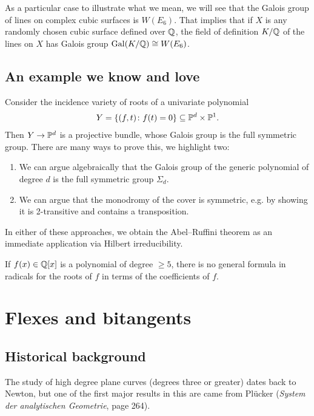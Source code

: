 \documentclass[11pt]{amsart}
\begin{document}
As a particular case to illustrate what we mean, we will see that the Galois group of lines on complex cubic surfaces is $W(E_6)$. That implies that if $X$ is any randomly chosen cubic surface defined over $\Q$, the field of definition $K/\Q$ of the lines on $X$ has Galois group $\Gal(K/\Q) \cong W(E_6)$.

\subsection{An example we know and love}

Consider the incidence variety of roots of a univariate polynomial
\begin{align*}
    Y = \left\{ (f,t) \colon f(t) = 0 \right\} \subseteq \P^d \times \P^1.
\end{align*}
Then $Y \to \P^d$ is a projective bundle, whose Galois group is the full symmetric group. There are many ways to prove this, we highlight two:
\begin{enumerate}
    \item We can argue algebraically that the Galois group of the generic polynomial of degree $d$ is the full symmetric group $\Sigma_d$.
    \item We can argue that the monodromy of the cover is symmetric, e.g. by showing it is 2-transitive and contains a transposition.
\end{enumerate}

In either of these approaches, we obtain the Abel--Ruffini theorem as an immediate application via Hilbert irreducibility.

\begin{theorem} If $f(x) \in \Q[x]$ is a polynomial of degree $\ge 5$, there is no general formula in radicals for the roots of $f$ in terms of the coefficients of $f$.
\end{theorem}

\section{Flexes and bitangents}

\subsection{Historical background}

The study of high degree plane curves (degrees three or greater) dates back to Newton, but one of the first major results in this are came from Pl\"{u}cker (\textit{System der analytischen Geometrie}, page 264).
\end{document}
